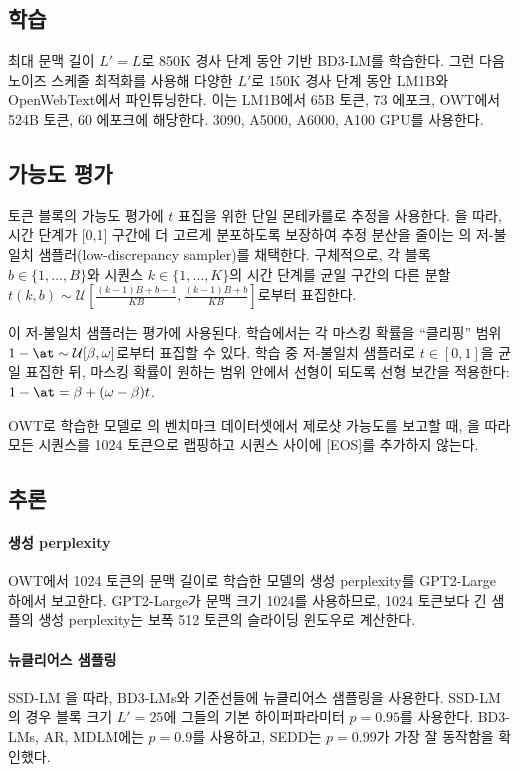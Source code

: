 \documentclass{article} %
\def\algos{BD3-LMs}
\def\algo{BD3-LM}
\begin{document}
\subsection{학습}
\label{suppl:training}
최대 문맥 길이 $L'=L$로 850K 경사 단계 동안 기반 \algo{}를 학습한다. 그런 다음 노이즈 스케줄 최적화를 사용해 다양한 $L'$로 150K 경사 단계 동안 LM1B와 OpenWebText에서 파인튜닝한다. 이는 LM1B에서 65B 토큰, 73 에포크, OWT에서 524B 토큰, 60 에포크에 해당한다. 3090, A5000, A6000, A100 GPU를 사용한다.

\subsection{가능도 평가}
토큰 블록의 가능도 평가에 $t$ 표집을 위한 단일 몬테카를로 추정을 사용한다. \cite{sahoo2024simple}을 따라, 시간 단계가 [0,1] 구간에 더 고르게 분포하도록 보장하여 추정 분산을 줄이는 \citet{kingma2021variational}의 저-불일치 샘플러(low-discrepancy sampler)를 채택한다. 구체적으로, 각 블록 $b \in \{1, \dots, B\}$와 시퀀스 $k \in \{1, \dots, K\}$의 시간 단계를 균일 구간의 다른 분할 $t(k, b) \sim \mathcal{U}[ \frac{(k-1)B + b - 1}{KB}, \frac{(k-1)B + b}{KB} ]$로부터 표집한다.

이 저-불일치 샘플러는 평가에 사용된다. 학습에서는 각 마스킹 확률을 ``클리핑'' 범위 $1 - \at \sim \mathcal{U}[\beta, \omega]$로부터 표집할 수 있다. 학습 중 저-불일치 샘플러로 $t \in [0, 1]$을 균일 표집한 뒤, 마스킹 확률이 원하는 범위 안에서 선형이 되도록 선형 보간을 적용한다: $1 - \at = \beta + (\omega - \beta) t$.

OWT로 학습한 모델로 \citet{radford2019language}의 벤치마크 데이터셋에서 제로샷 가능도를 보고할 때, \citet{sahoo2024simple}을 따라 모든 시퀀스를 1024 토큰으로 랩핑하고 시퀀스 사이에 [EOS]를 추가하지 않는다.

\subsection{추론}
\label{suppl:eval-details}
    \paragraph{생성 perplexity}
    OWT에서 1024 토큰의 문맥 길이로 학습한 모델의 생성 perplexity를 GPT2-Large 하에서 보고한다. GPT2-Large가 문맥 크기 1024를 사용하므로, 1024 토큰보다 긴 샘플의 생성 perplexity는 보폭 512 토큰의 슬라이딩 윈도우로 계산한다.

    \paragraph{뉴클리어스 샘플링}
    SSD-LM \citep{han2022ssd}을 따라, \algos{}와 기준선들에 뉴클리어스 샘플링을 사용한다. SSD-LM의 경우 블록 크기 $L'=25$에 그들의 기본 하이퍼파라미터 $p=0.95$를 사용한다. \algos{}, AR, MDLM에는 $p=0.9$를 사용하고, SEDD는 $p=0.99$가 가장 잘 동작함을 확인했다.
\end{document}
